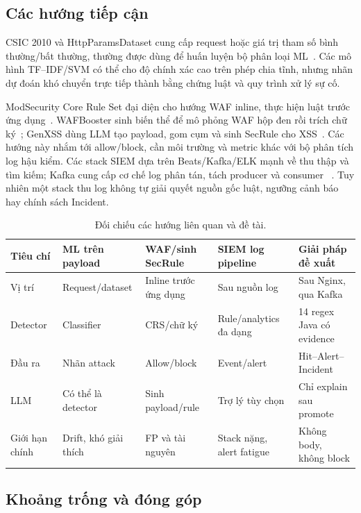 \documentclass[runningheads]{report-template/llncs}
\begin{document}
\subsection{Các hướng tiếp cận}

CSIC 2010 và HttpParamsDataset cung cấp request hoặc giá trị tham số bình
thường/bất thường, thường được dùng để huấn luyện bộ phân loại
ML~\cite{csic,httpParams}. Các mô hình TF--IDF/SVM có thể cho độ chính xác
cao trên phép chia tĩnh, nhưng nhãn dự đoán khó chuyển trực tiếp thành
bằng chứng luật và quy trình xử lý sự cố.

ModSecurity Core Rule Set đại diện cho hướng WAF inline, thực hiện luật
trước ứng dụng~\cite{modsecurity}. WAFBooster sinh biến thể để mô phỏng
WAF hộp đen rồi trích chữ ký~\cite{wafbooster}; GenXSS dùng LLM tạo payload,
gom cụm và sinh SecRule cho XSS~\cite{genxss}. Các hướng này nhắm tới
allow/block, cần môi trường và metric khác với bộ phân tích log hậu kiểm.
Các stack SIEM dựa trên Beats/Kafka/ELK mạnh về thu thập và tìm kiếm;
Kafka cung cấp cơ chế log phân tán, tách producer và consumer
~\cite{kafka}. Tuy nhiên một stack thu log không tự giải quyết nguồn gốc
luật, ngưỡng cảnh báo hay chính sách Incident.

\begin{table}
\caption{Đối chiếu các hướng liên quan và đề tài.}
\label{tab:related}
\centering\scriptsize
\begin{tabularx}{\textwidth}{@{}p{20mm}YYYY@{}}
\toprule
Tiêu chí & ML trên payload & WAF/sinh SecRule & SIEM log pipeline &
Giải pháp đề xuất\\
\midrule
Vị trí & Request/dataset & Inline trước ứng dụng & Sau nguồn log &
Sau Nginx, qua Kafka\\
Detector & Classifier & CRS/chữ ký & Rule/analytics đa dạng &
14 regex Java có evidence\\
Đầu ra & Nhãn attack & Allow/block & Event/alert &
Hit--Alert--Incident\\
LLM & Có thể là detector & Sinh payload/rule & Trợ lý tùy chọn &
Chỉ explain sau promote\\
Giới hạn chính & Drift, khó giải thích & FP và tài nguyên &
Stack nặng, alert fatigue & Không body, không block\\
\bottomrule
\end{tabularx}
\end{table}

\subsection{Khoảng trống và đóng góp}
\end{document}
